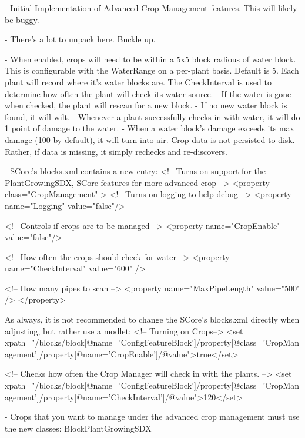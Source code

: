 \begin{DoxyVerb} 
    - Initial Implementation of Advanced Crop Management features. This will likely be buggy.

    - There's a lot to unpack here. Buckle up.

    - When enabled, crops will need to be within a 5x5 block radious of water block. 
        This is configurable with the WaterRange on a per-plant basis. Default is 5.
        Each plant will record where it's water blocks are. 
        The CheckInterval is used to determine how often the plant will check its water source.
            - If the water is gone when checked, the plant will rescan for a new block.
            - If no new water block is found, it will wilt.
            - Whenever a plant successfully checks in with water, it will do 1 point of damage to the water.
                - When a water block's damage exceeds its max damage (100 by default), it will turn into air.
        Crop data is not persisted to disk. Rather, if data is missing, it simply rechecks and re-discovers.

    - SCore's blocks.xml contains a new entry:
        <!-- Turns on support for the PlantGrowingSDX, SCore features for more advanced crop -->
        <property class="CropManagement" >
            <!-- Turns on logging to help debug -->
            <property name="Logging" value="false"/>

            <!-- Controls if crops are to be managed -->
            <property name="CropEnable" value="false"/>

            <!-- How often the crops should check for water -->
            <property name="CheckInterval" value="600" />

            <!-- How many pipes to scan -->
            <property name="MaxPipeLength" value="500" />
        </property>

        As always, it is not recommended to change the SCore's blocks.xml directly when adjusting, but rather use a modlet:
            <!-- Turning on Crops-->
            <set xpath="/blocks/block[@name='ConfigFeatureBlock']/property[@class='CropManagement']/property[@name='CropEnable']/@value">true</set>

            <!-- Checks how often the Crop Manager will check in with the plants. -->
            <set xpath="/blocks/block[@name='ConfigFeatureBlock']/property[@class='CropManagement']/property[@name='CheckInterval']/@value">120</set>


    - Crops that you want to manage under the advanced crop management must use the new classes:
        BlockPlantGrowingSDX


\end{DoxyVerb}
